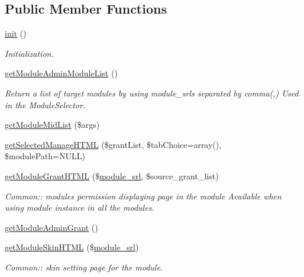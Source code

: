 \subsection*{Public Member Functions}
\begin{DoxyCompactItemize}
\item 
\hyperlink{classmoduleAdminModel_ad12d0ad0d64fc00df2ffef5d95446ff9}{init} ()
\begin{DoxyCompactList}\small\item\em Initialization. \end{DoxyCompactList}\item 
\hyperlink{classmoduleAdminModel_ab87a76519a343b50db20d17983b4d2c7}{get\+Module\+Admin\+Module\+List} ()
\begin{DoxyCompactList}\small\item\em Return a list of target modules by using module\+\_\+srls separated by comma(,) Used in the Module\+Selector. \end{DoxyCompactList}\item 
\hyperlink{classmoduleAdminModel_af1e58f7c102a8ee238f25ff2b193e6d7}{get\+Module\+Mid\+List} (\$args)
\item 
\hyperlink{classmoduleAdminModel_ada2b0f866658526c7cf2bb5876b0c087}{get\+Selected\+Manage\+H\+T\+M\+L} (\$grant\+List, \$tab\+Choice=array(), \$module\+Path=N\+U\+L\+L)
\item 
\hyperlink{classmoduleAdminModel_a0ab602897fb53096f7b232338c533839}{get\+Module\+Grant\+H\+T\+M\+L} (\$\hyperlink{ko_8install_8php_a370bb6450fab1da3e0ed9f484a38b761}{module\+\_\+srl}, \$source\+\_\+grant\+\_\+list)
\begin{DoxyCompactList}\small\item\em Common\+:\+: module\textquotesingle{}s permission displaying page in the module Available when using module instance in all the modules. \end{DoxyCompactList}\item 
\hyperlink{classmoduleAdminModel_a84f8431365473f8ddb70cb9cc1976db1}{get\+Module\+Admin\+Grant} ()
\item 
\hyperlink{classmoduleAdminModel_a7d52af7d5e35ad9ea0749a550e28e483}{get\+Module\+Skin\+H\+T\+M\+L} (\$\hyperlink{ko_8install_8php_a370bb6450fab1da3e0ed9f484a38b761}{module\+\_\+srl})
\begin{DoxyCompactList}\small\item\em Common\+:\+: skin setting page for the module. \end{DoxyCompactList}\item 

\end{DoxyCompactItemize}
